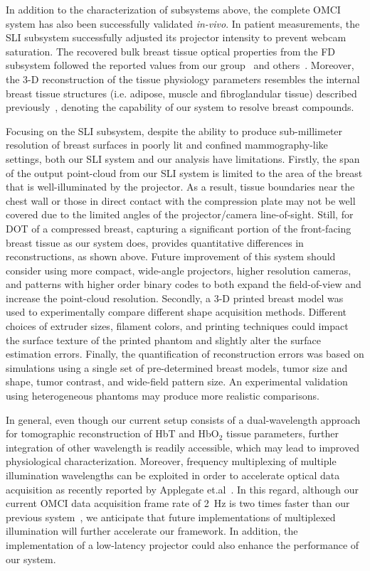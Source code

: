 In addition to the characterization of subsystems above, the complete OMCI system has also been successfully validated \textit{in-vivo}. In patient measurements, the SLI subsystem successfully adjusted its projector intensity to prevent webcam saturation. The recovered bulk breast tissue optical properties from the FD subsystem followed the reported values from our group~\cite{Fang2009} and others~\cite{Durduran2002}. Moreover, the 3-D reconstruction of the tissue physiology parameters resembles the internal breast tissue structures (i.e. adipose, muscle and fibroglandular tissue) described previously~\cite{Fang2009}, denoting the capability of our system to resolve breast compounds.

Focusing on the SLI subsystem, despite the ability to produce sub-millimeter resolution of breast surfaces in poorly lit and confined mammography-like settings, both our SLI system and our analysis have limitations. Firstly, the span of the output point-cloud from our SLI system is limited to the area of the breast that is well-illuminated by the projector. As a result, tissue boundaries near the chest wall or those in direct contact with the compression plate may not be well covered due to the limited angles of the projector/camera line-of-sight. Still, for DOT of a compressed breast, capturing a significant portion of the front-facing breast tissue as our system does, provides quantitative differences in reconstructions, as shown above. Future improvement of this system should consider using more compact, wide-angle projectors, higher resolution cameras, and patterns with higher order binary codes to both expand the field-of-view and increase the point-cloud resolution. Secondly, a 3-D printed breast model was used to experimentally compare different shape acquisition methods. Different choices of extruder sizes, filament colors, and printing techniques could impact the surface texture of the printed phantom and slightly alter the surface estimation errors. Finally, the quantification of reconstruction errors was based on simulations using a single set of pre-determined breast models, tumor size and shape, tumor contrast, and wide-field pattern size. An experimental validation using heterogeneous phantoms may produce more realistic comparisons.

In general, even though our current setup consists of a dual-wavelength approach for tomographic reconstruction of HbT and HbO$_2$ tissue parameters, further integration of other wavelength is readily accessible, which may lead to improved physiological characterization. Moreover, frequency multiplexing of multiple illumination wavelengths can be exploited in order to accelerate optical data acquisition as recently reported by Applegate et.al~\cite{Applegate2017}. In this regard, although our current OMCI data acquisition frame rate of 2~Hz is two times faster than our previous system~\cite{Zimmermann2017}, we anticipate that future implementations of multiplexed illumination will further accelerate our framework. In addition, the implementation of a low-latency projector could also enhance the performance of our system. 

